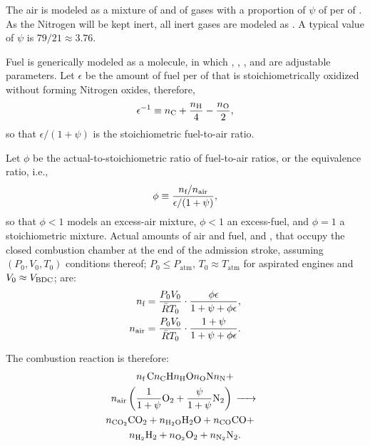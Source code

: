    The air is modeled as a mixture of  and of  gases with a proportion of $\psi$ {\kilo\mole} of  per {\kilo\mole} of . As the Nitrogen will  be  kept  inert,  all
    inert gases are modeled as . A typical value of $\psi$ is $79/21 \approx 3.76$.

    Fuel is generically modeled as a  mol\-e\-cule, in which \NC, \NH, \NO, and {\NN} are adjustable parameters. Let $\epsilon$ be the amount of fuel  per  {\kilo\mole}
    of  that is stoichiometrically oxidized without forming Nitrogen oxides, therefore,%
    \begin{equation}
        \epsilon^{-1} \equiv \NC + \frac{\NH}{4} - \frac{\NO}{2},
        \label{eq:epsilon}
    \end{equation}
    \noindent so that $\epsilon / (1 + \psi)$ is the stoichiometric fuel-to-air ratio.

    Let $\phi$ be the actual-to-stoichiometric ratio of fuel-to-air ratios, or the equivalence ratio, i.e.,%
    \begin{equation}
        \phi \equiv \frac{n_{\mbox{\scriptsize f}}/n_{\mbox{\scriptsize air}}}{\epsilon / (1 + \psi)},
        \label{eq:phi}
    \end{equation}
    \noindent so that $\phi < 1$ models an excess-air mixture, $\phi < 1$ an excess-fuel, and $\phi = 1$ a stoichiometric mixture. Actual amounts of air and fuel, {\NA} and  \NF,  that  occupy
    the closed combustion chamber at the end of the admission stroke, assuming $(P_0, V_0, T_0)$ conditions thereof;  $P_0  \leqslant  P_{\mathrm{atm}}$,  $T_0  \approx  T_{\mathrm{atm}}$  for
    aspirated engines and $V_0 \approx V_{\mbox{\scriptsize BDC}}$; are:%
    \begin{align}
        \label{eq:nf}
        n_{\mbox{\scriptsize f}}     &= \frac{P_0V_0}{\bar{R}T_0}\cdot\frac{\phi\epsilon}{1 + \psi + \phi\epsilon}, \\
        \label{eq:na}
        n_{\mbox{\scriptsize air}}     &= \frac{P_0V_0}{\bar{R}T_0}\cdot\frac{1 + \psi}{1 + \psi + \phi\epsilon}.
    \end{align}

    The combustion reaction is therefore:%
    \begin{multline}
        \NF\,\mbox{\ce{C\NC H\NH O\NO N\NN}} +\\
        \NA\left(
            \frac{1}{1+\psi}\mbox{\ce{O2}} +
            \frac{\psi}{1+\psi}\mbox{\ce{N2}}
        \right) \ce{->} \\ \shoveright
        {\NCOO\mbox{\ce{CO2}} +
        \NHHO\mbox{\ce{H2O}} +
        \NCO\mbox{\ce{CO}} +} \\
        \NHH\mbox{\ce{H2}} +
        \NOO\mbox{\ce{O2}} +
        \NNN\mbox{\ce{N2}}.
        \label{eq:comb}
    \end{multline}

